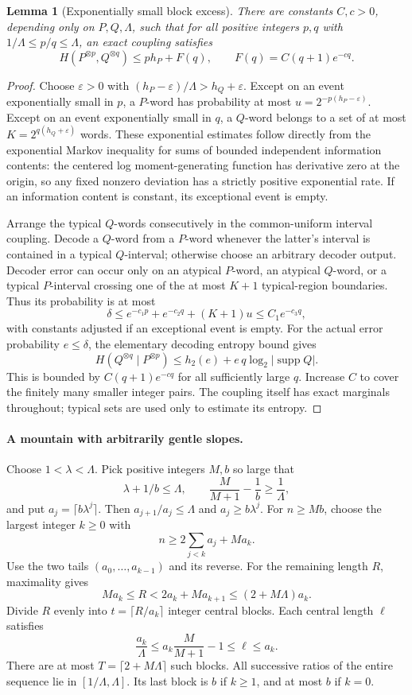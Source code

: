 \documentclass[11pt,a4paper]{article}
\newtheorem{lemma}[theorem]{Lemma}
\begin{document}
\begin{lemma}[Exponentially small block excess]\label{lem:exp}
There are constants $C,c>0$, depending only on $P,Q,\Lambda$, such that
for all positive integers $p,q$ with $1/\Lambda\le p/q\le\Lambda$,
an exact coupling satisfies
\[
H(P^{\otimes p},Q^{\otimes q})\le ph_P+F(q),
\qquad F(q)=C(q+1)e^{-cq}.
\]
\end{lemma}
\begin{proof}
Choose $\varepsilon>0$ with
$(h_P-\varepsilon)/\Lambda>h_Q+\varepsilon$.
Except on an event exponentially small in $p$, a $P$-word has
probability at most $u=2^{-p(h_P-\varepsilon)}$.
Except on an event exponentially small in $q$, a $Q$-word belongs to a
set of at most $K=2^{q(h_Q+\varepsilon)}$ words.
These exponential estimates follow directly from the exponential Markov
inequality for sums of bounded independent information contents: the
centered log moment-generating function has derivative zero at the origin,
so any fixed nonzero deviation has a strictly positive exponential rate.
If an information content is constant, its exceptional event is empty.

Arrange the typical $Q$-words consecutively in the common-uniform interval
coupling. Decode a $Q$-word from a $P$-word whenever the latter's interval
is contained in a typical $Q$-interval; otherwise choose an arbitrary
decoder output. Decoder error can occur only on an atypical $P$-word,
an atypical $Q$-word, or a typical $P$-interval crossing one of the at
most $K+1$ typical-region boundaries. Thus its probability is at most
\[
\delta\le e^{-c_1p}+e^{-c_2q}+(K+1)u\le C_1e^{-c_3q},
\]
with constants adjusted if an exceptional event is empty.
For the actual error probability $e\le\delta$, the elementary decoding
entropy bound gives
\[
H(Q^{\otimes q}\mid P^{\otimes p})
\le h_2(e)+e\,q\log_2|\operatorname{supp}Q|.
\]
This is bounded by $C(q+1)e^{-cq}$ for all sufficiently large $q$.
Increase $C$ to cover the finitely many smaller integer pairs. The coupling
itself has exact marginals throughout; typical sets are used only to
estimate its entropy.
\end{proof}

\paragraph{A mountain with arbitrarily gentle slopes.}
Choose $1<\lambda<\Lambda$. Pick positive integers $M,b$ so large that
\[
\lambda+1/b\le\Lambda,\qquad
\frac{M}{M+1}-\frac1b\ge\frac1\Lambda,
\]
and put $a_j=\lceil b\lambda^j\rceil$. Then
$a_{j+1}/a_j\le\Lambda$ and $a_j\ge b\lambda^j$.
For $n\ge Mb$, choose the largest integer $k\ge0$ with
\[
n\ge2\sum_{j<k}a_j+Ma_k.
\]
Use the two tails $(a_0,\ldots,a_{k-1})$ and its reverse.
For the remaining length $R$, maximality gives
\[
Ma_k\le R<2a_k+Ma_{k+1}\le(2+M\Lambda)a_k.
\]
Divide $R$ evenly into $t=\lceil R/a_k\rceil$ integer central blocks.
Each central length $\ell$ satisfies
\[
\frac{a_k}{\Lambda}\le
a_k\frac{M}{M+1}-1\le\ell\le a_k.
\]
There are at most $T=\lceil2+M\Lambda\rceil$ such blocks.
All successive ratios of the entire sequence lie in
$[1/\Lambda,\Lambda]$. Its last block is $b$ if $k\ge1$, and at most
$b$ if $k=0$.
\end{document}
